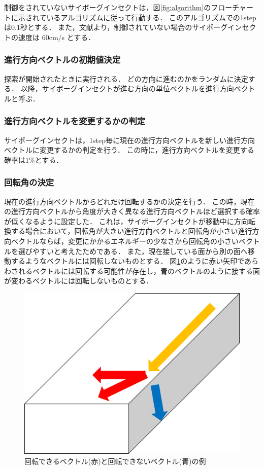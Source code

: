 \documentclass[a4paper,11pt]{jarticle}
\begin{document}
	制御をされていないサイボーグインセクトは，図\ref{fig:algorithm}のフローチャートに示されているアルゴリズムに従って行動する．
	このアルゴリズムでの1stepは0.1秒とする．
	また，文献より\cite{speed}，制御されていない場合のサイボーグインセクトの速度は 60cm/s とする．
	
	\subsubsection{進行方向ベクトルの初期値決定}
	\label{random}
	探索が開始されたときに実行される．
	どの方向に進むのかをランダムに決定する．
	以降，サイボーグインセクトが進む方向の単位ベクトルを進行方向ベクトルと呼ぶ．
		
	\subsubsection{進行方向ベクトルを変更するかの判定}
	\label{carb}
	サイボーグインセクトは，1step毎に現在の進行方向ベクトルを新しい進行方向ベクトルに変更するかの判定を行う．
	この時に，進行方向ベクトルを変更する確率は1\%とする．
	
	\subsubsection{回転角の決定}
	現在の進行方向ベクトルからどれだけ回転するかの決定を行う．
	この時，現在の進行方向ベクトルから角度が大きく異なる進行方向ベクトルほど選択する確率が低くなるように設定した．
	これは，サイボーグインセクトが移動中に方向転換する場合において，回転角が大きい進行方向ベクトルと回転角が小さい進行方向ベクトルならば，変更にかかるエネルギーの少なさから回転角の小さいベクトルを選びやすいと考えたためである．
	また，現在接している面から別の面へ移動するようなベクトルには回転しないものとする．
	図\ref{fig:bend}のように赤い矢印であらわされるベクトルには回転する可能性が存在し，青のベクトルのように接する面が変わるベクトルには回転しないものとする．
	\begin{figure}
		\centering
		\includegraphics[width=0.35\linewidth]{png/bend.png}
		\caption[ベクトルの決定]{回転できるベクトル(赤)と回転できないベクトル(青)の例}
		\label{fig:bend}
	\end{figure}
	
\end{document}
